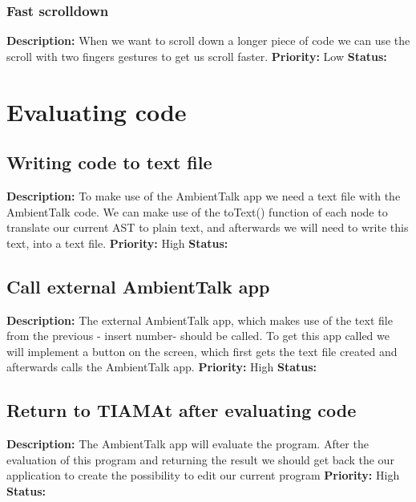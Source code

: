 \documentclass[a4paper,12pt]{report}
\begin{document}
\subsubsection{Fast scrolldown}
\textbf{Description: }When we want to scroll down a longer piece of code we can use the scroll with two fingers gestures to get us scroll faster. \newline
\textbf{Priority:} Low \newline
\textbf{Status: } \newline
\section{Evaluating code}
\subsection{Writing code to text file}
\textbf{Description: }To make use of the AmbientTalk app we need a text file with the AmbientTalk code. We can make use of the toText() function of each node to translate our
current AST to plain text, and afterwards we will need to write this text, into a text file.  \newline
\textbf{Priority:} High \newline
\textbf{Status: } \newline
\subsection{Call external AmbientTalk app}
\textbf{Description: }The external AmbientTalk app, which makes use of the text file from the previous - insert number- should be called. To get this app called we will implement
a button on the screen, which first gets the text file created and afterwards calls the AmbientTalk app. \newline
\textbf{Priority:} High \newline
\textbf{Status: } \newline
\subsection{Return to TIAMAt after evaluating code}
\textbf{Description: } The AmbientTalk app will evaluate the program. After the evaluation of this program and returning the result we should get back the our application to
create the possibility to edit our current program\newline
\textbf{Priority:} High \newline
\textbf{Status: } \newline
\end{document}
